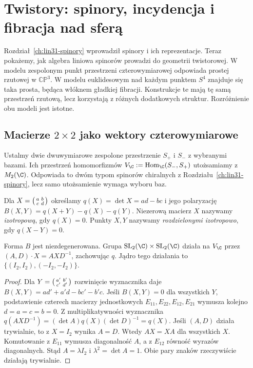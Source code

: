 \chapter{Twistory: spinory, incydencja i fibracja nad sferą}
\label{ch:lin32-twistory}
Rozdział~\ref{ch:lin31-spinory} wprowadził spinory i ich reprezentacje.
Teraz pokażemy, jak algebra liniowa spinorów prowadzi do geometrii
twistorowej. W modelu zespolonym punkt przestrzeni czterowymiarowej
odpowiada prostej rzutowej w $\mathbb{CP}^3$. W modelu euklidesowym
nad każdym punktem $S^4$ znajduje się taka prosta, będąca włóknem
gładkiej fibracji. Konstrukcje te mają tę samą przestrzeń rzutową,
lecz korzystają z różnych dodatkowych struktur. Rozróżnienie
obu modeli jest istotne.

\section{Macierze \texorpdfstring{$2\times2$}{2x2} jako wektory czterowymiarowe}
\label{sec:lin32-macierze}
Ustalmy dwie dwuwymiarowe zespolone przestrzenie $S_+$ i $S_-$
z wybranymi bazami. Ich przestrzeń homomorfizmów
$V_{\C}:=\operatorname{Hom}_{\C}(S_-,S_+)$
utożsamiamy z $M_2(\C)$. Odpowiada to dwóm typom
spinorów chiralnych z Rozdziału~\ref{ch:lin31-spinory},
lecz samo utożsamienie wymaga wyboru baz.

\begin{definicja}
\label{def:lin32-forma}
Dla $X=\begin{psmallmatrix}a&b\\c&d\end{psmallmatrix}$
określamy $q(X)=\det X=ad-bc$ i jego polaryzację
$B(X,Y)=q(X+Y)-q(X)-q(Y)$.
Niezerową macierz $X$ nazywamy \emph{izotropową},
gdy $q(X)=0$. Punkty $X,Y$ nazywamy
\emph{rozdzielonymi izotropowo}, gdy $q(X-Y)=0$.
\end{definicja}

\begin{stwierdzenie}
\label{prop:lin32-dzialanie}
Forma $B$ jest niezdegenerowana.
Grupa $\mathrm{SL}_2(\C)\times\mathrm{SL}_2(\C)$ działa na
$V_{\C}$ przez $(A,D)\cdot X=AXD^{-1}$, zachowując $q$.
Jądro tego działania to
$\{(I_2,I_2),(-I_2,-I_2)\}$.
\end{stwierdzenie}
\begin{proof}
Dla $Y=\begin{psmallmatrix}a'&b'\\c'&d'\end{psmallmatrix}$
rozwinięcie wyznacznika daje
$B(X,Y)=ad'+a'd-bc'-b'c$.
Jeśli $B(X,Y)=0$ dla wszystkich $Y$, podstawienie
czterech macierzy jednostkowych $E_{11},E_{22},E_{12},E_{21}$
wymusza kolejno $d=a=c=b=0$.
Z multiplikatywności wyznacznika
$q(AXD^{-1})=(\det A)q(X)(\det D)^{-1}=q(X)$.
Jeśli $(A,D)$ działa trywialnie, to z $X=I_2$
wynika $A=D$. Wtedy $AX=XA$ dla wszystkich $X$.
Komutowanie z $E_{11}$ wymusza diagonalność $A$,
a z $E_{12}$ równość wyrazów diagonalnych.
Stąd $A=\lambda I_2$ i $\lambda^2=\det A=1$.
Obie pary znaków rzeczywiście działają trywialnie.
\end{proof}

